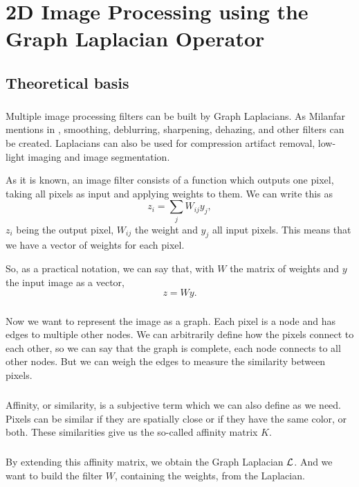 \chapter{2D Image Processing using the Graph Laplacian Operator}

\section{Theoretical basis}

\paragraph{}
Multiple image processing filters can be built by Graph Laplacians. As Milanfar mentions in \cite{siam_slides_2016}, smoothing, deblurring, sharpening, dehazing, and other filters can be created.
Laplacians can also be used for compression artifact removal, low-light imaging and image segmentation.

As it is known, an image filter consists of a function which outputs one pixel, taking all pixels as input and applying weights to them. We can write this as
\[z_i = \sum_j W_{ij}y_j,\]
\(z_i\) being the output pixel, \(W_{ij}\) the weight and \(y_j\) all input pixels.
This means that we have a vector of weights for each pixel.

So, as a practical notation, we can say that, with \(W\) the matrix of weights and \(y\) the input image as a vector,
\[z = Wy.\]

\paragraph{}
Now we want to represent the image as a graph.
Each pixel is a node and has edges to multiple other nodes.
We can arbitrarily define how the pixels connect to each other, so we can say that the graph is complete, each node connects to all other nodes.
But we can weigh the edges to measure the similarity between pixels.

\paragraph{}
Affinity, or similarity, is a subjective term which we can also define as we need.
Pixels can be similar if they are spatially close or if they have the same color, or both.
These similarities give us the so-called affinity matrix \(K\).

\paragraph{}
By extending this affinity matrix, we obtain the Graph Laplacian \(\operatorname{\mathcal{L}}\).
And we want to build the filter \(W\), containing the weights, from the Laplacian.

